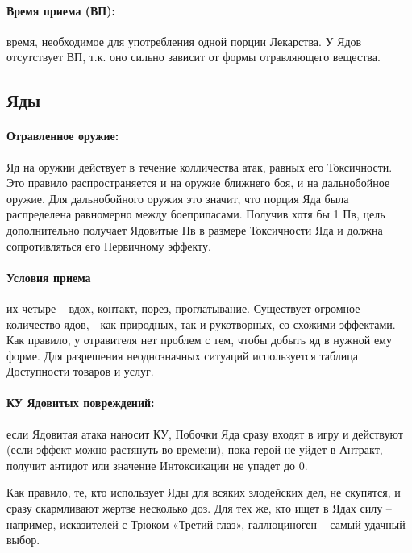 \paragraph{Время приема (ВП):} время, необходимое для употребления одной порции Лекарства. У Ядов отсутствует ВП, т.к. оно сильно зависит от формы отравляющего вещества. 
\printindex[potions]

\subsection{Яды}
\paragraph{Отравленное оружие:} Яд на оружии действует в течение колличества атак, равных его Токсичности. Это правило распространяется и на оружие ближнего боя, и на дальнобойное оружие. Для дальнобойного оружия это значит, что порция Яда была распределена равномерно между боеприпасами. 
\newline Получив хотя бы 1 Пв, цель дополнительно получает Ядовитые Пв в размере Токсичности Яда и должна сопротивляться его Первичному эффекту.
\paragraph{Условия приема} их четыре – вдох, контакт, порез, проглатывание.
\newline Существует огромное количество ядов, - как природных, так и рукотворных, со схожими эффектами. Как правило, у отравителя нет проблем с тем, чтобы добыть яд в нужной ему форме. Для разрешения неоднозначных ситуаций используется таблица Доступности товаров и услуг.
\paragraph{КУ Ядовитых повреждений:} если Ядовитая атака наносит КУ, Побочки Яда сразу входят в игру и действуют (если эффект можно растянуть во времени), пока герой не уйдет в Антракт, получит антидот или значение Интоксикации не упадет до 0.
\printindex[poisons]
\begin{tcolorbox}
    Как правило, те, кто использует Яды для всяких злодейских дел, не скупятся, и сразу скармливают жертве несколько доз.
    \newline Для тех же, кто ищет в Ядах силу – например, исказителей с Трюком «Третий глаз», галлюциноген – самый удачный выбор.
\end{tcolorbox}
